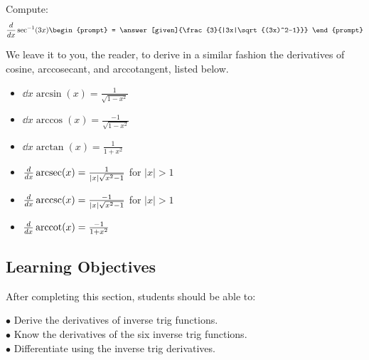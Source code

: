 \documentclass{ximera}
\begin{document}
\begin{question}
  Compute:
  \[
  \ddx \sec^{-1}(3x)
  \begin{prompt}
    = \answer[given]{\frac{3}{|3x|\sqrt{(3x)^2-1}}}
  \end{prompt}
  \]
\end{question}

We leave it to you, the reader, to derive in a similar fashion the derivatives of
cosine, arccosecant, and arccotangent, listed below.

\begin{theorem} \hfil
\begin{itemize}
\item $\dd{x} \arcsin(x) = \frac{1}{\sqrt{1-x^2}}$
\item $\dd{x} \arccos(x) = \frac{-1}{\sqrt{1-x^2}}$
\item $\dd{x} \arctan(x) = \frac{1}{1+x^2}$
\item $\frac{\mathop{}\!d }{\mathop{}\!d x} \operatorname{arcsec}(x) = \frac{1}{|x|\sqrt{x^2-1}}$ for $|x|>1$
\item $\frac{\mathop{}\!d }{\mathop{}\!d x} \operatorname{arccsc}(x) = \frac{-1}{|x|\sqrt{x^2-1}}$ for $|x|>1$
\item $\frac{\mathop{}\!d }{\mathop{}\!d x} \operatorname{arccot}(x) = \frac{-1}{1+x^2}$
\end{itemize}
\end{theorem}

\subsection{Learning Objectives}
After completing this section, students should be able to:
\vspace{.05in}

\noindent$\bullet$ Derive the derivatives of inverse trig functions.
\\$\bullet$ Know the derivatives of the six inverse trig functions.
\\$\bullet$ Differentiate using the inverse trig derivatives.

\end{document}
